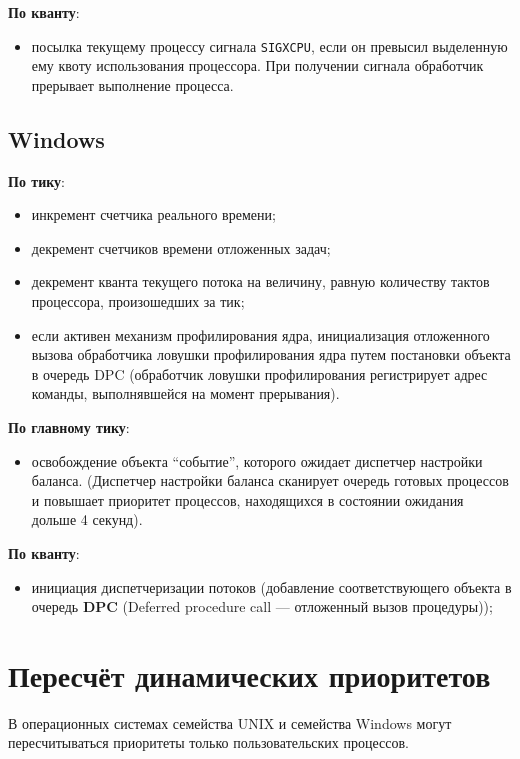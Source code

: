 \textbf{По кванту}:
\begin{itemize}
    \item посылка текущему процессу сигнала \texttt{SIGXCPU}, если он превысил выделенную ему квоту использования процессора. При получении сигнала обработчик прерывает выполнение процесса.
\end{itemize}


\section{Windows}

\textbf{По тику}:
\begin{itemize}
    \item инкремент счетчика реального времени;
    \item декремент счетчиков времени отложенных задач;
    \item декремент кванта текущего потока на величину, равную количеству тактов процессора, произошедших за тик;
    \item если активен механизм профилирования ядра, инициализация отложенного вызова обработчика ловушки профилирования ядра путем постановки объекта в очередь DPC (обработчик ловушки профилирования регистрирует адрес команды, выполнявшейся на момент прерывания).
\end{itemize}

\textbf{По главному тику}:
\begin{itemize}
    \item освобождение объекта ``событие'', которого ожидает диспетчер настройки баланса. (Диспетчер настройки баланса сканирует очередь готовых процессов и повышает приоритет процессов, находящихся в состоянии ожидания дольше 4 секунд).
\end{itemize}

\textbf{По кванту}:
\begin{itemize}
    \item инициация диспетчеризации потоков (добавление соответствующего объекта в очередь \textbf{DPC} (Deferred procedure call — отложенный вызов процедуры));
\end{itemize}


\chapter{Пересчёт динамических приоритетов}

В операционных системах семейства UNIX и семейства Windows могут пересчитываться приоритеты только пользовательских процессов.


